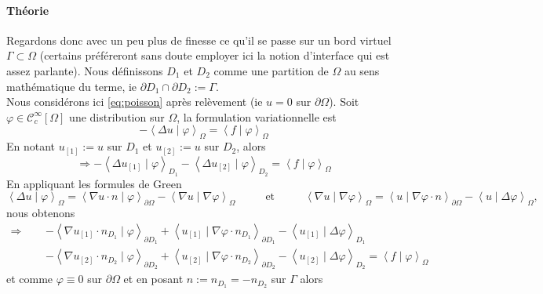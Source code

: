 \documentclass[a4paper,11pt]{article}
\begin{document}
\paragraph{Théorie}
\noindent Regardons donc avec un peu plus de finesse ce qu'il se passe sur un bord virtuel $\Gamma \subset \Omega$ (certains préféreront sans doute employer ici la notion d'interface qui est assez parlante). Nous définissons $D_1$ et $D_2$ comme une partition de $\Omega$ au sens mathématique du terme, ie $\partial D_1 \cap \partial D_2 := \Gamma$. \\
Nous considérons ici \eqref{eq:poisson} après relèvement (ie $u = 0$ sur $\partial \Omega$). Soit $\varphi \in \mathcal{C}^{\infty}_c\left[\Omega\right]$ une distribution sur $\Omega$, la formulation variationnelle est
\begin{equation*}
	-\left<\Delta u\mid \varphi\right>_{\Omega} = \left<f\mid \varphi\right>_{\Omega}
\end{equation*}
En notant $u_{[1]} := u$ sur $D_1$ et $u_{[2]} := u$ sur $D_2$, alors
\begin{equation*}
	\Longrightarrow -\left<\Delta u_{[1]}\mid \varphi\right>_{D_1} - \left<\Delta u_{[2]}\mid \varphi\right>_{D_2} = \left<f\mid \varphi\right>_{\Omega}
\end{equation*}
En appliquant les formules de Green
\begin{equation*}
	\left<\Delta u\mid \varphi\right>_{\Omega} = \left<\nabla u \cdot n\mid \varphi\right>_{\partial\Omega} - \left<\nabla u\mid \nabla\varphi\right>_{\Omega}\hspace{1cm}\text{ et }\hspace{1cm}
	\left<\nabla u\mid \nabla\varphi\right>_{\Omega} = \left<u\mid \nabla\varphi \cdot n\right>_{\partial\Omega}-\left<u\mid \Delta\varphi\right>_{\Omega},
\end{equation*}
nous obtenons
\begin{align*}
	\Longrightarrow &-\left<\nabla u_{[1]}\cdot n_{D_1}\mid \varphi\right>_{\partial D_1} + \left<u_{[1]}\mid\nabla \varphi\cdot n_{D_1}\right>_{\partial D_1} - \left<u_{[1]} \mid \Delta \varphi\right>_{D_1}\\
	\hspace{1cm} &-\left<\nabla u_{[2]}\cdot n_{D_2}\mid \varphi\right>_{\partial D_2} + \left<u_{[2]}\mid\nabla \varphi\cdot n_{D_2}\right>_{\partial D_2} - \left<u_{[2]} \mid \Delta \varphi\right>_{D_2} = \left<f\mid \varphi\right>_{\Omega}
\end{align*}
et comme $\varphi \equiv 0$ sur $\partial\Omega$ et en posant $n:= n_{D_1} = -n_{D_2}$ sur $\Gamma$ alors
\end{document}
